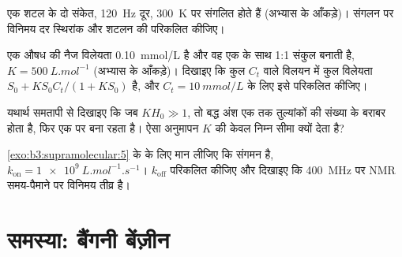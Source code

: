 \begin{exercise}[$\star\star$]\label{exo:b3:supramolecular:9}
एक  शटल के दो संकेत, \qty{120}{Hz} दूर, \qty{300}{K} पर संगलित होते हैं (अभ्यास के
आँकड़े)। संगलन पर विनिमय दर स्थिरांक और शटलन की 
परिकलित कीजिए।
\end{exercise}

\begin{exercise}[$\star\star\star$]\label{exo:b3:supramolecular:10}
एक औषध की नैज विलेयता \qty{0.10}{mmol/L} है और वह एक
 के साथ 1:1 संकुल बनाती है, $K = \qty{500}{L.mol^{-1}}$ (अभ्यास के आँकड़े)। दिखाइए कि
कुल  $C_t$ वाले विलयन में कुल विलेयता $S_0 + KS_0C_t/(1 + KS_0)$ है, और $C_t = \qty{10}{mmol/L}$ के लिए इसे परिकलित कीजिए।
\end{exercise}

\begin{exercise}[$\star\star\star$]\label{exo:b3:supramolecular:11}
यथार्थ समतापी से दिखाइए कि जब $KH_0 \gg 1$, तो बद्ध अंश एक तक
तुल्यांकों की संख्या के बराबर होता है, फिर एक पर बना रहता है। ऐसा अनुमापन
$K$ की केवल निम्न सीमा क्यों देता है?
\end{exercise}

\begin{exercise}[$\star\star\star$]\label{exo:b3:supramolecular:12}
\cref{exo:b3:supramolecular:5} के  के लिए मान लीजिए कि संगमन
 है, $k_{\mathrm{on}} = \qty{1e9}{L.mol^{-1}.s^{-1}}$। $k_{\mathrm{off}}$ परिकलित कीजिए और दिखाइए कि
\qty{400}{MHz} पर NMR समय-पैमाने पर विनिमय तीव्र है।
\end{exercise}

\section{समस्या: बैंगनी बेंज़ीन}

